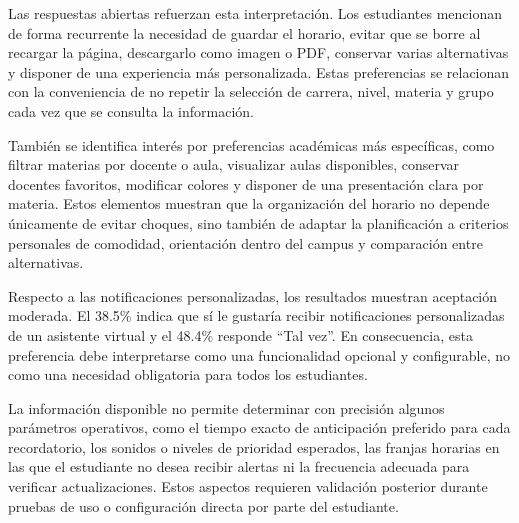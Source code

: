 Las respuestas abiertas refuerzan esta interpretación. Los estudiantes mencionan de forma recurrente la necesidad de guardar el horario, evitar que se borre al recargar la página, descargarlo como imagen o PDF, conservar varias alternativas y disponer de una experiencia más personalizada. Estas preferencias se relacionan con la conveniencia de no repetir la selección de carrera, nivel, materia y grupo cada vez que se consulta la información.

También se identifica interés por preferencias académicas más específicas, como filtrar materias por docente o aula, visualizar aulas disponibles, conservar docentes favoritos, modificar colores y disponer de una presentación clara por materia. Estos elementos muestran que la organización del horario no depende únicamente de evitar choques, sino también de adaptar la planificación a criterios personales de comodidad, orientación dentro del campus y comparación entre alternativas.

Respecto a las notificaciones personalizadas, los resultados muestran aceptación moderada. El 38.5\% indica que sí le gustaría recibir notificaciones personalizadas de un asistente virtual y el 48.4\% responde ``Tal vez''. En consecuencia, esta preferencia debe interpretarse como una funcionalidad opcional y configurable, no como una necesidad obligatoria para todos los estudiantes.

La información disponible no permite determinar con precisión algunos parámetros operativos, como el tiempo exacto de anticipación preferido para cada recordatorio, los sonidos o niveles de prioridad esperados, las franjas horarias en las que el estudiante no desea recibir alertas ni la frecuencia adecuada para verificar actualizaciones. Estos aspectos requieren validación posterior durante pruebas de uso o configuración directa por parte del estudiante.
